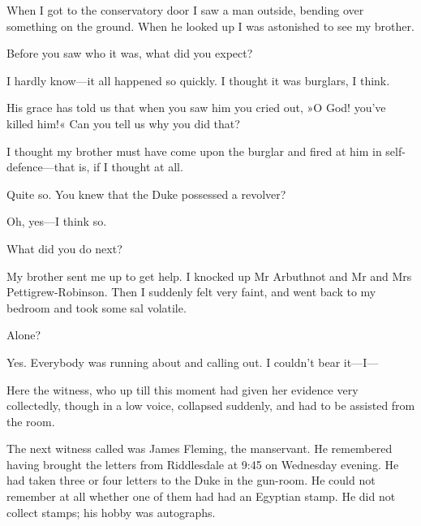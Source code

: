 \begin{dialogue}
  When I got to the conservatory door I saw a man outside, bending over something on the ground. When he looked up I was astonished to see my brother.

 Before you saw who it was, what did you expect?

 I hardly know—it all happened so quickly. I thought it was burglars, I think.

 His grace has told us that when you saw him you cried out, »O God! you've killed him!« Can you tell us why you did that?

  I thought my brother must have come upon the burglar and fired at him in self-defence—that is, if I thought at all.

 Quite so. You knew that the Duke possessed a revolver?

 Oh, yes—I think so.

 What did you do next?

 My brother sent me up to get help. I knocked up Mr Arbuthnot and Mr and Mrs Pettigrew-Robinson. Then I suddenly felt very faint, and went back to my bedroom and took some sal volatile.

 Alone?

 Yes. Everybody was running about and calling out. I couldn't bear it—I—
\end{dialogue}

Here the witness, who up till this moment had given her evidence very collectedly, though in a low voice, collapsed suddenly, and had to be assisted from the room.


The next witness called was James Fleming, the manservant. He remembered having brought the letters from Riddlesdale at 9:45 on Wednesday evening. He had taken three or four letters to the Duke in the gun-room. He could not remember at all whether one of them had had an Egyptian stamp. He did not collect stamps; his hobby was autographs.

